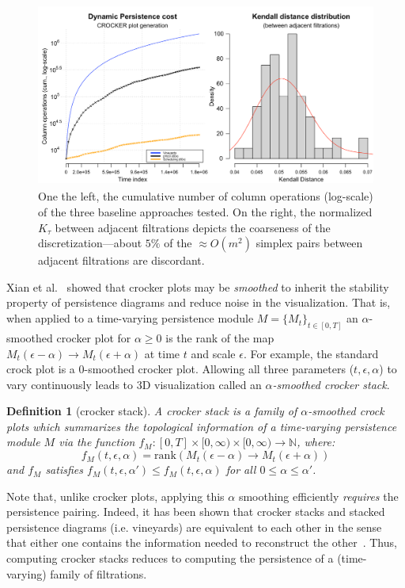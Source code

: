 \documentclass[sn-mathphys]{sn-jnl}
\newtheorem{definition}{Definition}
\begin{document}
\begin{figure}[ht]
	\centering
	\includegraphics[width=\textwidth, height=16.35em]{boid_sim_results.png}
	\caption{ One the left, the cumulative number of column operations (log-scale) of the three baseline approaches tested. On the right, the normalized $K_\tau$ between adjacent filtrations depicts the coarseness of the discretization---about $5\%$ of the $\approx O(m^2)$ simplex pairs between adjacent filtrations are discordant.}
	\label{fig:boid_sim_results}
\end{figure}

Xian et al.~\cite{xian2020capturing} showed that crocker plots may be \emph{smoothed} to inherit the stability property of persistence diagrams and reduce noise in the visualization. That is, when applied to a time-varying persistence module $M = \{M_t\}_{t \in [0, T]}$ an $\alpha$-smoothed crocker plot for $\alpha \geq 0$ is the rank of the map $M_t(\epsilon - \alpha) \to M_t(\epsilon + \alpha)$ at time $t$ and scale $\epsilon$. For example, the standard crock plot is a $0$-smoothed crocker plot. Allowing all three parameters ($t, \epsilon, \alpha$) to vary continuously leads to 3D visualization called an $\alpha$\emph{-smoothed crocker stack}.
\begin{definition}[crocker stack]
	A crocker stack is a family of $\alpha$-smoothed crock plots which summarizes the topological information of a time-varying persistence module $M$ via the function $f_M : [0, T] \times [0, \infty) \times [0, \infty) \to \mathbb{N}$, where:
	$$ f_M(t,\epsilon, \alpha) = \mathrm{rank}(M_t(\epsilon - \alpha) \to M_t(\epsilon + \alpha)) $$
	and $f_M$ satisfies $f_M(t,\epsilon,\alpha') \leq f_M(t,\epsilon, \alpha)$ for all $0 \leq \alpha \leq \alpha'$.
\end{definition}
\noindent Note that, unlike crocker plots, applying this $\alpha$ smoothing efficiently \emph{requires} the persistence pairing. Indeed, it has been shown that crocker stacks and stacked persistence diagrams (i.e. vineyards) are equivalent to each other in the sense that either one contains the information needed to reconstruct the other~\cite{xian2020capturing}. Thus, computing crocker stacks reduces to computing the persistence of a (time-varying) family of filtrations.
\end{document}
